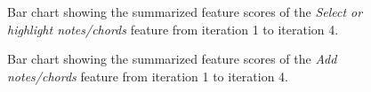 			\begin{figure}[H]
				\centering
			    \caption{Bar chart showing the summarized feature scores of the \textit{Select or highlight notes/chords} feature from iteration 1 to iteration 4.}
			    \label{fig:select-bar}
			\end{figure} 

			\begin{figure}[H]
				\centering
			    \caption{Bar chart showing the summarized feature scores of the \textit{Add notes/chords} feature from iteration 1 to iteration 4.}
			    \label{fig:add-bar}
			\end{figure} 

